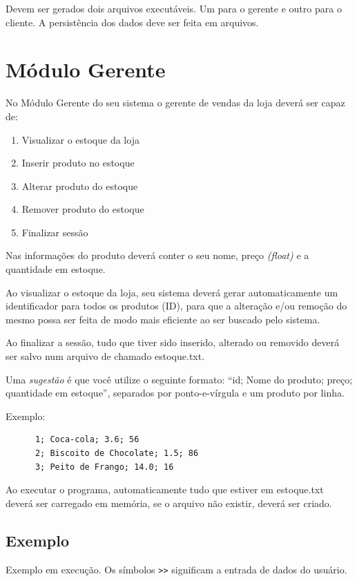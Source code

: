 \documentclass[12pt]{article}
\begin{document}
Devem ser gerados dois arquivos executáveis. Um para o gerente e outro para o cliente. A persistência dos dados deve ser feita em arquivos.

\section{Módulo Gerente}
No Módulo Gerente do seu sistema o gerente de vendas da loja deverá ser capaz de:

\begin{enumerate}
  \item Visualizar o estoque da loja
  \item Inserir produto no estoque
  \item Alterar produto do estoque
  \item Remover produto do estoque
  \item Finalizar sessão
\end{enumerate}

Nas informações do produto deverá conter o seu nome, preço \textit{(float)} e a quantidade em estoque. 

Ao visualizar o estoque da loja, seu sistema deverá gerar automaticamente um identificador para todos os produtos (ID), para que a alteração e/ou remoção do mesmo possa ser feita de modo mais eficiente ao ser buscado pelo sistema.

Ao finalizar a sessão, tudo que tiver sido inserido, alterado ou removido deverá ser salvo num arquivo de chamado estoque.txt.

Uma {\it sugestão} é que você utilize o seguinte formato:
“id; Nome do produto; preço; quantidade em estoque”, separados por ponto-e-vírgula e um produto por linha.

Exemplo:

\begin{verbatim}
	  1; Coca-cola; 3.6; 56
	  2; Biscoito de Chocolate; 1.5; 86
	  3; Peito de Frango; 14.0; 16
\end{verbatim}

Ao executar o programa, automaticamente tudo que estiver em estoque.txt deverá ser carregado em memória, se o arquivo não existir, deverá ser criado.

\subsection{Exemplo}
Exemplo em execução. Os símbolos \verb|>>| significam a entrada de dados do usuário.
\end{document}
